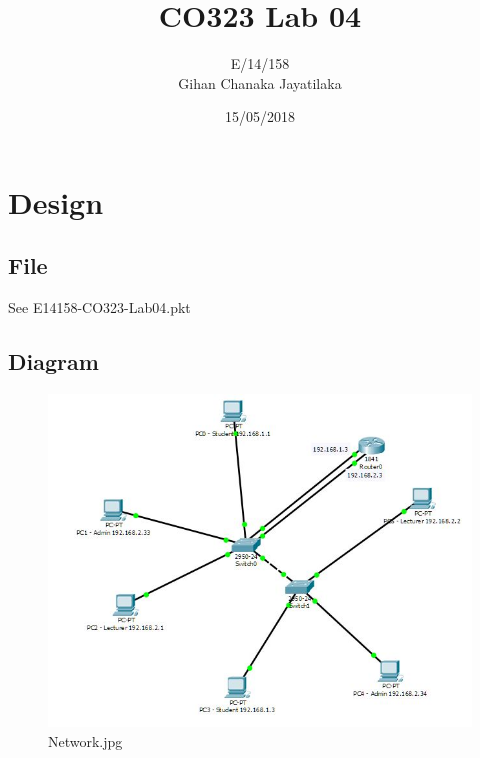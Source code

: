 \documentclass{article}
\title{CO323 Lab 04}
\author{E/14/158\\Gihan Chanaka Jayatilaka }
\date{15/05/2018}
\begin{document}
\maketitle

\section{Design}
\subsection{File}
See E14158-CO323-Lab04.pkt\\
\subsection{Diagram}
\begin{figure}[h]
    \centering
    \includegraphics[scale=0.5]{VLANS}
    \caption{Network.jpg}
    \label{fig:Network configuration}
\end{figure}
\end{document}
